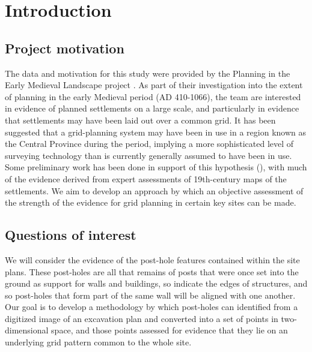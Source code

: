 \documentclass[../../ArchStats.tex]{subfiles}
\begin{document}
\section{Introduction}

\subsection{Project motivation}
The data and motivation for this study were provided by the Planning in the Early Medieval Landscape project \cite{PEML}. As part of their investigation into the extent of planning in the early Medieval period (AD 410-1066), the team are interested in evidence of planned settlements on  a large scale, and particularly in evidence that settlements may have been laid out over a common grid. It has been suggested that a grid-planning system may have been in use in a region known as the Central Province during the period, implying a more sophisticated level of surveying technology than is currently generally assumed to have been in use. Some preliminary work has been done in support of this hypothesis (\cite{Blair2013}), with much of the evidence derived from expert assessments of 19th-century maps of the settlements. We aim to develop an approach by which an objective assessment of the strength of the evidence for grid planning in certain key sites can be made.

\subsection{Questions of interest}

We will consider the evidence of the post-hole features contained within the site plans. These post-holes are all that remains of posts that were once set into the ground as support for walls and buildings, so indicate the edges of structures, and so post-holes that form part of the same wall will be aligned with one another. Our goal is to develop a methodology by which post-holes can identified from  a digitized image of an excavation plan and converted into a set of points in two-dimensional space, and those points assessed for evidence that they lie on an underlying grid pattern common to the whole site. 
\end{document}
